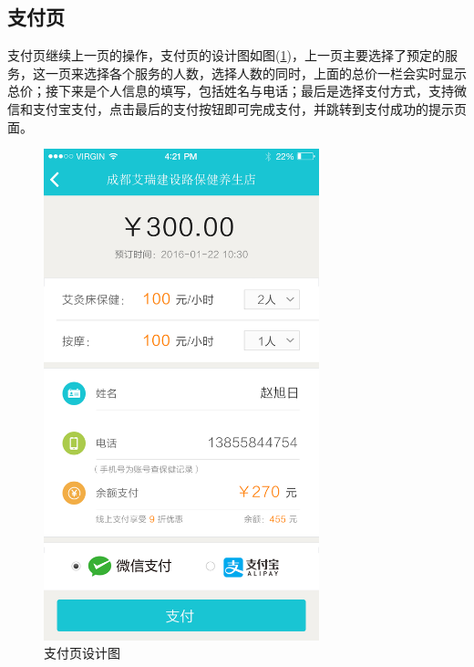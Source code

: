     \subsection{支付页}
      \label{subsec:支付页}
        支付页继续上一页的操作，支付页的设计图如图(\ref{fig:pay_dsn})，上一页主要选择了预定的服务，这一页来选择各个服务的人数，选择人数的同时，上面的总价一栏会实时显示总价；接下来是个人信息的填写，包括姓名与电话；最后是选择支付方式，支持微信和支付宝支付，点击最后的支付按钮即可完成支付，并跳转到支付成功的提示页面。
        \begin{figure}[htbp]
          \centering
          \includegraphics[width=8cm]{./img/pay_dsn.png}
          \caption{支付页设计图}
          \label{fig:pay_dsn}
        \end{figure}

